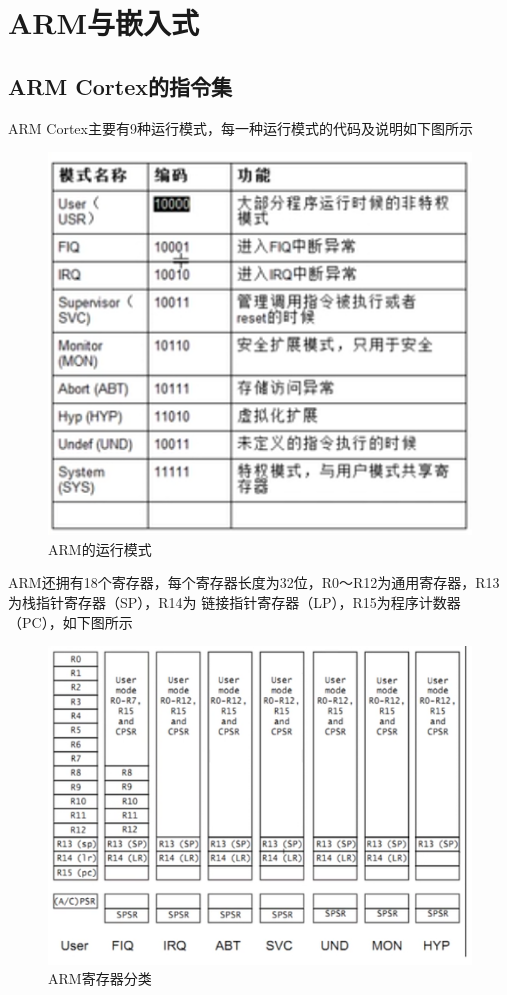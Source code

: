 \chapter{ARM与嵌入式}

\section{ARM Cortex的指令集}
ARM Cortex主要有9种运行模式，每一种运行模式的代码及说明如下图所示
\begin{figure}[H]
  \centering
  \includegraphics[scale=0.8]{arm_models.png}
  \caption{ARM的运行模式}
  \label{fig:arm_arch}
\end{figure}

ARM还拥有18个寄存器，每个寄存器长度为32位，R0～R12为通用寄存器，R13为栈指针寄存器（SP），R14为
链接指针寄存器（LP），R15为程序计数器（PC），如下图所示
\begin{figure}[H]
  \centering
  \includegraphics[scale=0.6]{arm_reg.png}
  \caption{ARM寄存器分类}
  \label{fig:arm_reg}
\end{figure}

